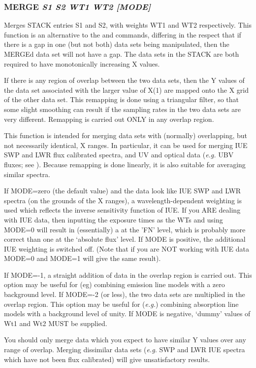 \documentclass[twoside,11pt,noabs,nolof]{starlink}
\providecommand{\dipcom}[3]{\subsubsection*{\label{COM:#1}\xlabel{COM:#1}\textbf{#1} \emph{#2}}}
\begin{document}
\dipcom{MERGE}{S1 S2 WT1 WT2 [MODE]}{Merges two arrays }
Merges STACK entries S1 and S2, with weights WT1 and WT2 respectively.
This function is an alternative to the   and   commands,
differing in the respect that if there is a gap in one (but not both)
data sets being manipulated, then the MERGEd data set will not have a
gap. The data sets in the STACK are both required to have monotonically
increasing X values.

If there is any region of overlap between the two data sets, then the Y
values of the data set associated with the larger value of X(1) are
mapped onto the X grid of the other data set. This remapping is done
using a triangular filter, so that some slight smoothing can result if
the sampling rates in the two data sets are very different. Remapping
is carried out ONLY in any overlap region.

This function is intended for merging data sets with (normally)
overlapping, but not necessarily identical, X ranges. In particular,
it can be used for merging IUE SWP and LWR flux calibrated spectra,
and UV and optical data (\emph{e.g.} UBV fluxes; see ).  Because
remapping is done linearly, it is also suitable for averaging similar
spectra.

If MODE=zero (the default value) and the data look like IUE SWP and
LWR spectra (on the grounds of the X ranges), a wavelength-dependent
weighting is used which reflects the inverse sensitivity function of
IUE. If you ARE dealing with IUE data, then inputting the exposure
times as the WTs and using MODE=0 will result in (essentially) a 
at the 'FN' level, which is probably more correct than one at the
`absolute flux' level. If MODE is positive, the additional IUE
weighting is switched off. (Note that if you are NOT working with IUE
data MODE=0 and MODE=1 will give the same result).

If MODE=-1, a straight addition of data in the overlap region is
carried out. This option may be useful for (eg) combining emission
line models with a zero background level. If MODE=-2 (or less), the
two data sets are multiplied in the overlap region. This option may be
useful for (\emph{e.g.}) combining absorption line models with a
background level of unity. If MODE is negative, `dummy' values of Wt1
and Wt2 MUST be supplied.

You should only merge data which you expect to have similar Y values
over any range of overlap. Merging dissimilar data sets (\emph{e.g.} SWP
and LWR IUE spectra which have not been flux calibrated) will give
unsatisfactory results.
\end{document}
